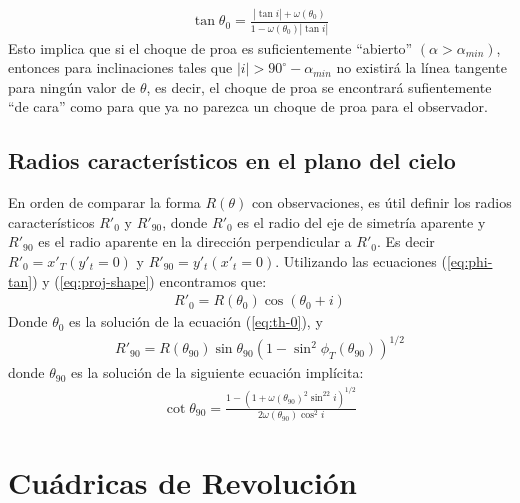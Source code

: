 \begin{align}
  \tan\theta_0 = \frac{|\tan i| + \omega(\theta_0)}{1 - \omega(\theta_0)|\tan i|}
  \label{eq:th-0}
\end{align}
Esto implica que si el choque de proa es suficientemente ``abierto'' $(\alpha > \alpha_{min})$, entonces para inclinaciones tales que
$|i| > 90^\circ - \alpha_{min}$ no existirá la línea tangente para ningún valor de $\theta$, es decir, el choque de proa se encontrará sufientemente ``de cara'' como para que ya no parezca un choque de proa para el observador.

\subsection{Radios característicos en el plano del cielo}

En orden de comparar la forma $R(\theta)$ con observaciones, es útil definir los radios característicos $R'_0$ y $R'_{90}$, donde $R'_0$ es el radio del eje de simetría aparente y $R'_{90}$ es el radio aparente en la dirección perpendicular a $R'_0$. Es decir
$R'_0 = x'_T(y'_t=0)$ y $R'_{90} = y'_t(x'_t = 0)$. Utilizando las ecuaciones (\ref{eq:phi-tan}) y (\ref{eq:proj-shape}) encontramos que:
\begin{align}
R'_0 = R(\theta_0)\cos(\theta_0 + i)
\label{eq:R0p}
\end{align}
Donde $\theta_0$ es la solución de la ecuación (\ref{eq:th-0}), y
\begin{align}
  R'_{90} = R(\theta_{90})\sin\theta_{90}\left(1-\sin^2\phi_T(\theta_{90})\right)^{1/2}
  \label{eq:R90p}
\end{align}
donde $\theta_{90}$ es la solución de la siguiente ecuación implícita:
\begin{align}
  \cot\theta_{90} = \frac{1 - \left(1+\omega(\theta_{90})^2\sin^22i\right)^{1/2}}
  {2\omega(\theta_{90})\cos^2i}
  \label{eq:th90}
\end{align}

\section{Cuádricas de Revolución}
\label{sec:quadrics}
\newcommand\Sin{\ensuremath{\mathcal{S}}}
\newcommand\Cos{\ensuremath{\mathcal{C}}}
\newcommand\Cot{\ensuremath{\mathcal{T}}}
\newcommand\Q{\ensuremath{\mathcal{Q}}}

